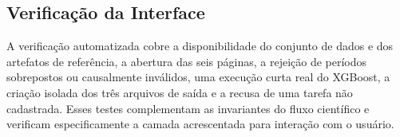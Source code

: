 \subsection{Verificação da Interface}

A verificação automatizada cobre a disponibilidade do conjunto de dados e dos artefatos de referência, a abertura das seis páginas, a rejeição de períodos sobrepostos ou causalmente inválidos, uma execução curta real do XGBoost, a criação isolada dos três arquivos de saída e a recusa de uma tarefa não cadastrada. Esses testes complementam as invariantes do fluxo científico e verificam especificamente a camada acrescentada para interação com o usuário.
